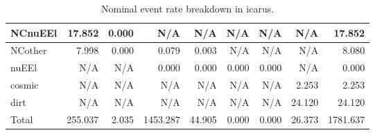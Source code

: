 \begin{table}
\begin{adjustbox}{width=1\textwidth}
\begin{tabular} {l r r r r r r r r}
        \\ \hline
 NCnuEEl      & 17.852               & 0.000                & N/A                  & N/A                  & N/A                  & N/A                  & N/A                  & 17.852               \\ \hline
 NCother      & 7.998                & 0.000                & 0.079                & 0.003                & N/A                  & N/A                  & N/A                  & 8.080                \\ \hline
 nuEEl        & N/A                  & N/A                  & 0.000                & 0.000                & 0.000                & 0.000                & N/A                  & 0.000                \\ \hline
 cosmic       & N/A                  & N/A                  & N/A                  & N/A                  & N/A                  & N/A                  & 2.253                & 2.253                \\ \hline
 dirt         & N/A                  & N/A                  & N/A                  & N/A                  & N/A                  & N/A                  & 24.120               & 24.120               \\ \hline
\hline
 Total        & 255.037              & 2.035                & 1453.287             & 44.905               & 0.000                & 0.000                & 26.373               & 1781.637             \\ \hline

\end{tabular}
\end{adjustbox}

\caption[Nominal \nue event rate breakdown in \gls{icarus}.]{Nominal \nue event rate breakdown in \gls{icarus}.}
\label{table:icarus_nue_event_rate}
\end{table}

